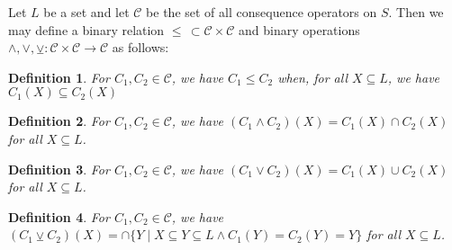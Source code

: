 \documentclass[12pt]{article}
\newtheorem{definition}{Definition}
\begin{document}
Let $L$ be a set and let $\mathcal{C}$ be the set of all consequence operators
on $S$.  Then we may define a binary relation $\le \,\subset \mathcal{C} \times
\mathcal{C}$ and binary operations $\wedge, \vee, \veebar \colon \mathcal{C}\times \mathcal{C} \to \mathcal{C}$ as follows:

\begin{definition}
For $C_1, C_2 \in \mathcal{C}$, we have $C_1 \le C_2$ when, for all 
$X \subseteq L$, we have $C_1 (X) \subseteq C_2 (X)$
\end{definition}

\begin{definition}
For $C_1, C_2 \in \mathcal{C}$, we have $(C_1 \wedge C_2) (X) = 
C_1 (X) \cap C_2 (X)$ for all $X \subseteq L$.
\end{definition}

\begin{definition}
For $C_1, C_2 \in \mathcal{C}$, we have $(C_1 \vee C_2) (X) = 
C_1 (X) \cup C_2 (X)$ for all $X \subseteq L$.
\end{definition}

\begin{definition}
For $C_1, C_2 \in \mathcal{C}$, we have $(C_1 \veebar C_2) (X) =
\cap \{ Y \mid X \subseteq Y \subseteq L \land C_1 (Y) = C_2 (Y)
= Y \}$ for all $X \subseteq L$.
\end{definition}
\end{document}
